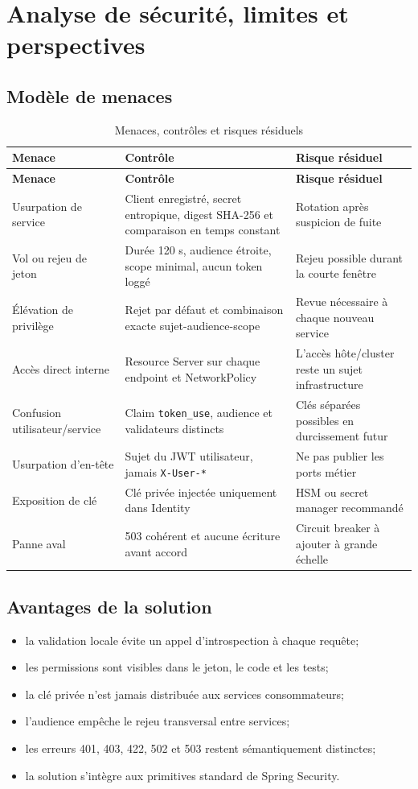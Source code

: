 \documentclass[12pt,a4paper,oneside]{report}
\newcommand{\code}[1]{\texttt{#1}}
\begin{document}
\chapter{Analyse de sécurité, limites et perspectives}

\section{Modèle de menaces}
\begin{longtable}{P{3.2cm}P{6.1cm}P{4.2cm}}
\caption{Menaces, contrôles et risques résiduels}\label{tab:threat-model}\\
\toprule
\textbf{Menace} & \textbf{Contrôle} & \textbf{Risque résiduel} \\
\midrule
\endfirsthead
\toprule
\textbf{Menace} & \textbf{Contrôle} & \textbf{Risque résiduel} \\
\midrule
\endhead
Usurpation de service & Client enregistré, secret entropique, digest SHA-256 et comparaison en temps constant & Rotation après suspicion de fuite \\
Vol ou rejeu de jeton & Durée 120 s, audience étroite, scope minimal, aucun token loggé & Rejeu possible durant la courte fenêtre \\
Élévation de privilège & Rejet par défaut et combinaison exacte sujet-audience-scope & Revue nécessaire à chaque nouveau service \\
Accès direct interne & Resource Server sur chaque endpoint et NetworkPolicy & L'accès hôte/cluster reste un sujet infrastructure \\
Confusion utilisateur/service & Claim \code{token\_use}, audience et validateurs distincts & Clés séparées possibles en durcissement futur \\
Usurpation d'en-tête & Sujet du JWT utilisateur, jamais \code{X-User-*} & Ne pas publier les ports métier \\
Exposition de clé & Clé privée injectée uniquement dans Identity & HSM ou secret manager recommandé \\
Panne aval & 503 cohérent et aucune écriture avant accord & Circuit breaker à ajouter à grande échelle \\
\bottomrule
\end{longtable}

\section{Avantages de la solution}
\begin{itemize}
  \item la validation locale évite un appel d'introspection à chaque requête;
  \item les permissions sont visibles dans le jeton, le code et les tests;
  \item la clé privée n'est jamais distribuée aux services consommateurs;
  \item l'audience empêche le rejeu transversal entre services;
  \item les erreurs 401, 403, 422, 502 et 503 restent sémantiquement distinctes;
  \item la solution s'intègre aux primitives standard de Spring Security.
\end{itemize}
\end{document}
